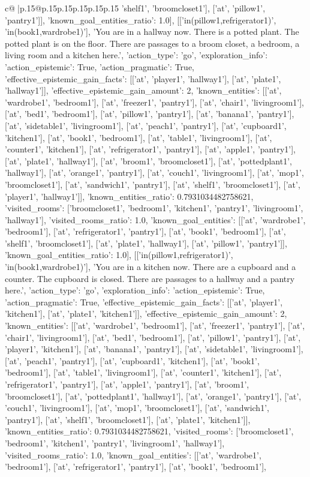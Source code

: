 \documentclass{article}
\begin{document}
{\begin{supertabular}{c@{$\;$}|p{.15\linewidth}@{}p{.15\linewidth}p{.15\linewidth}p{.15\linewidth}p{.15\linewidth}p{.15\linewidth}}
{{{'shelf1', 'broomcloset1'], ['at', 'pillow1', 'pantry1']], 'known_goal_entities_ratio': 1.0}}], [['in(pillow1,refrigerator1)', 'in(book1,wardrobe1)'], 'You are in a hallway now. There is a potted plant. The potted plant is on the floor. There are passages to a broom closet, a bedroom, a living room and a kitchen here.', {'action_type': 'go', 'exploration_info': {'action_epistemic': True, 'action_pragmatic': True, 'effective_epistemic_gain_facts': [['at', 'player1', 'hallway1'], ['at', 'plate1', 'hallway1']], 'effective_epistemic_gain_amount': 2, 'known_entities': [['at', 'wardrobe1', 'bedroom1'], ['at', 'freezer1', 'pantry1'], ['at', 'chair1', 'livingroom1'], ['at', 'bed1', 'bedroom1'], ['at', 'pillow1', 'pantry1'], ['at', 'banana1', 'pantry1'], ['at', 'sidetable1', 'livingroom1'], ['at', 'peach1', 'pantry1'], ['at', 'cupboard1', 'kitchen1'], ['at', 'book1', 'bedroom1'], ['at', 'table1', 'livingroom1'], ['at', 'counter1', 'kitchen1'], ['at', 'refrigerator1', 'pantry1'], ['at', 'apple1', 'pantry1'], ['at', 'plate1', 'hallway1'], ['at', 'broom1', 'broomcloset1'], ['at', 'pottedplant1', 'hallway1'], ['at', 'orange1', 'pantry1'], ['at', 'couch1', 'livingroom1'], ['at', 'mop1', 'broomcloset1'], ['at', 'sandwich1', 'pantry1'], ['at', 'shelf1', 'broomcloset1'], ['at', 'player1', 'hallway1']], 'known_entities_ratio': 0.7931034482758621, 'visited_rooms': ['broomcloset1', 'bedroom1', 'kitchen1', 'pantry1', 'livingroom1', 'hallway1'], 'visited_rooms_ratio': 1.0, 'known_goal_entities': [['at', 'wardrobe1', 'bedroom1'], ['at', 'refrigerator1', 'pantry1'], ['at', 'book1', 'bedroom1'], ['at', 'shelf1', 'broomcloset1'], ['at', 'plate1', 'hallway1'], ['at', 'pillow1', 'pantry1']], 'known_goal_entities_ratio': 1.0}}], [['in(pillow1,refrigerator1)', 'in(book1,wardrobe1)'], 'You are in a kitchen now. There are a cupboard and a counter. The cupboard is closed. There are passages to a hallway and a pantry here.', {'action_type': 'go', 'exploration_info': {'action_epistemic': True, 'action_pragmatic': True, 'effective_epistemic_gain_facts': [['at', 'player1', 'kitchen1'], ['at', 'plate1', 'kitchen1']], 'effective_epistemic_gain_amount': 2, 'known_entities': [['at', 'wardrobe1', 'bedroom1'], ['at', 'freezer1', 'pantry1'], ['at', 'chair1', 'livingroom1'], ['at', 'bed1', 'bedroom1'], ['at', 'pillow1', 'pantry1'], ['at', 'player1', 'kitchen1'], ['at', 'banana1', 'pantry1'], ['at', 'sidetable1', 'livingroom1'], ['at', 'peach1', 'pantry1'], ['at', 'cupboard1', 'kitchen1'], ['at', 'book1', 'bedroom1'], ['at', 'table1', 'livingroom1'], ['at', 'counter1', 'kitchen1'], ['at', 'refrigerator1', 'pantry1'], ['at', 'apple1', 'pantry1'], ['at', 'broom1', 'broomcloset1'], ['at', 'pottedplant1', 'hallway1'], ['at', 'orange1', 'pantry1'], ['at', 'couch1', 'livingroom1'], ['at', 'mop1', 'broomcloset1'], ['at', 'sandwich1', 'pantry1'], ['at', 'shelf1', 'broomcloset1'], ['at', 'plate1', 'kitchen1']], 'known_entities_ratio': 0.7931034482758621, 'visited_rooms': ['broomcloset1', 'bedroom1', 'kitchen1', 'pantry1', 'livingroom1', 'hallway1'], 'visited_rooms_ratio': 1.0, 'known_goal_entities': [['at', 'wardrobe1', 'bedroom1'], ['at', 'refrigerator1', 'pantry1'], ['at', 'book1', 'bedroom1'], }}}
\end{supertabular}}
\end{document}
